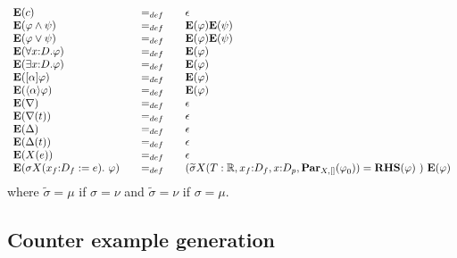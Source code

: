\begin{equation*}
\begin{array}{lll}
{\mathbf{E}}(c) & =_{def} & \epsilon  \\ 
{\mathbf{E}}(\varphi \wedge \psi ) & =_{def} & {\mathbf{E}}(\varphi ){%
\mathbf{E}}(\psi ) \\ 
{\mathbf{E}}(\varphi \vee \psi ) & =_{def} & {\mathbf{E}}(\varphi ){\mathbf{E%
}}(\psi ) \\ 
{\mathbf{E}}(\forall {x{:}D}.\varphi ) & =_{def} & {\mathbf{E}}(\varphi ) \\ 
{\mathbf{E}}(\exists {x{:}D}.\varphi ) & =_{def} & {\mathbf{E}}(\varphi ) \\ 
{\mathbf{E}}([\alpha ]\varphi ) & =_{def} & {\mathbf{E}}(\varphi ) \\ 
{\mathbf{E}}(\langle \alpha \rangle \varphi ) & =_{def} & {\mathbf{E}}%
(\varphi ) \\ 
{\mathbf{E}}(\nabla ) & =_{def} & \epsilon  \\ 
{\mathbf{E}}(\nabla (t)) & =_{def} & \epsilon  \\ 
{\mathbf{E}}(\Delta ) & =_{def} & \epsilon  \\ 
{\mathbf{E}}(\Delta (t)) & =_{def} & \epsilon  \\ 
{\mathbf{E}}(X(e)) & =_{def} & \epsilon  \\ 
{\mathbf{E}}(\sigma X(x_{f}{:}D_{f}:=e).~\varphi )~~~ & =_{def}~~~ & (%
\widetilde{\sigma }X(T:\mathbb{R},x_{f}{:}D_{f},x{:}D_{p},\mathbf{Par}%
_{X,[]}(\varphi _{0}))={\mathbf{RHS}}(\varphi )~)~{\mathbf{E}}(\varphi )%
\end{array}%
\end{equation*}%
where $\widetilde{\sigma }=\mu $ if $\sigma =\nu $ and $\widetilde{\sigma }%
=\nu $ if $\sigma =\mu $.

\subsection{Counter example generation}

